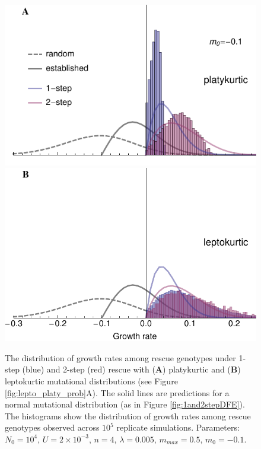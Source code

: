 \documentclass[9pt,twocolumn,twoside,lineno]{gsajnl}
\begin{document}
\begin{figure}[htbp]
\centering
\includegraphics[width=\linewidth]{dfe_platy_mild.pdf}\\
\includegraphics[width=\linewidth]{dfe_lepto_mild.pdf}\\
\caption{
The distribution of growth rates among rescue genotypes under 1-step (blue) and 2-step (red) rescue with (\textbf{A}) platykurtic and (\textbf{B}) leptokurtic mutational distributions (see Figure \ref{fig:lepto_platy_prob}A).
The solid lines are predictions for a normal mutational distribution (as in Figure \ref{fig:1and2stepDFE}).
The histograms show the distribution of growth rates among rescue genotypes observed across $10^5$ replicate simulations.
Parameters: $N_0=10^4$, $U=2\times 10^{-3}$, $n=4$, $\lambda=0.005$, $m_{max}=0.5$, $m_0=-0.1$.
}%
\label{fig:lepto_platy_dfe}
\end{figure}
\end{document}
